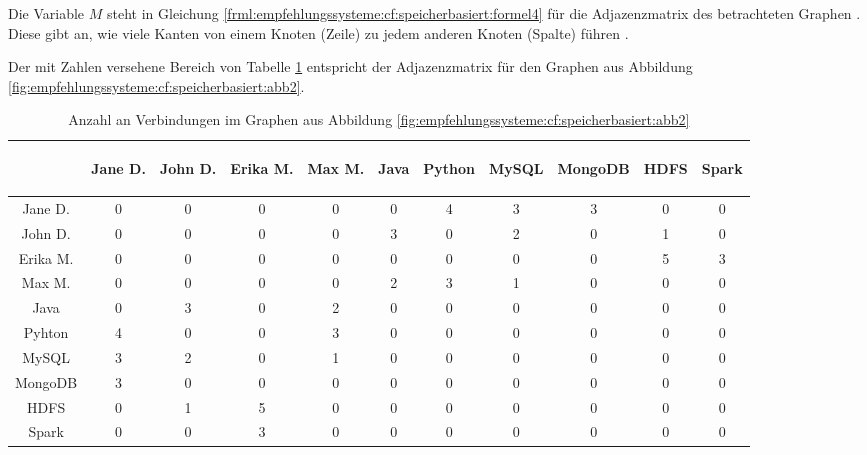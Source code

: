 Die Variable $M$ steht in Gleichung \ref{frml:empfehlungssysteme:cf:speicherbasiert:formel4} für die Adjazenzmatrix des betrachteten Graphen \cite[S. 4]{libenNowell:2007}. Diese gibt an, wie viele Kanten von einem Knoten (Zeile) zu jedem anderen Knoten (Spalte) führen \cite[S. 6]{guns:2014}.

Der mit Zahlen versehene Bereich von Tabelle \ref{tbl:empfehlungssysteme:arbeitsweise:tbl2} entspricht der Adjazenzmatrix für den Graphen aus Abbildung \ref{fig:empfehlungssysteme:cf:speicherbasiert:abb2}.

\begin{table}[h]
	\centering
	\begin{tabular}{c|c|c|c|c|c|c|c|c|c|c}
		& \begin{sideways}Jane D.\end{sideways} & \begin{sideways}John D.\end{sideways} & \begin{sideways}Erika M.\end{sideways} & \begin{sideways}Max M.\end{sideways} & \begin{sideways}Java\end{sideways} & \begin{sideways}Python\end{sideways} & \begin{sideways}MySQL\end{sideways} & \begin{sideways}MongoDB\end{sideways} & \begin{sideways}HDFS\end{sideways} & \begin{sideways}Spark\end{sideways} \\
		\hline
		Jane D.  & 0 & 0 & 0 & 0 & 0 & 4 & 3 & 3 & 0 & 0\\
		John D.  & 0 & 0 & 0 & 0 & 3 & 0 & 2 & 0 & 1 & 0\\
		Erika M. & 0 & 0 & 0 & 0 & 0 & 0 & 0 & 0 & 5 & 3\\
		Max M.   & 0 & 0 & 0 & 0 & 2 & 3 & 1 & 0 & 0 & 0\\
		Java     & 0 & 3 & 0 & 2 & 0 & 0 & 0 & 0 & 0 & 0\\
		Pyhton   & 4 & 0 & 0 & 3 & 0 & 0 & 0 & 0 & 0 & 0\\
		MySQL    & 3 & 2 & 0 & 1 & 0 & 0 & 0 & 0 & 0 & 0\\
		MongoDB  & 3 & 0 & 0 & 0 & 0 & 0 & 0 & 0 & 0 & 0\\
		HDFS     & 0 & 1 & 5 & 0 & 0 & 0 & 0 & 0 & 0 & 0\\
		Spark    & 0 & 0 & 3 & 0 & 0 & 0 & 0 & 0 & 0 & 0
	\end{tabular}
	\caption{Anzahl an Verbindungen im Graphen aus Abbildung \ref{fig:empfehlungssysteme:cf:speicherbasiert:abb2}}
	\label{tbl:empfehlungssysteme:arbeitsweise:tbl2}
\end{table}

